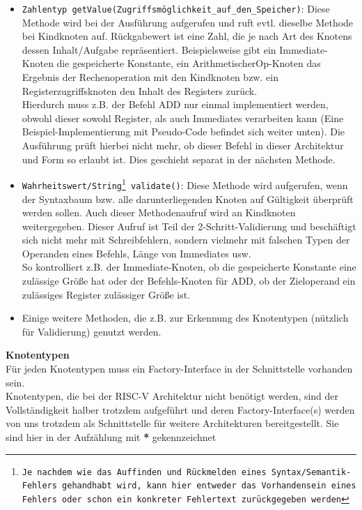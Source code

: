 \begin{itemize}
	\item \texttt{Zahlentyp getValue(Zugriffsmöglichkeit\_auf\_den\_Speicher)}: Diese Methode wird bei der Ausführung aufgerufen und ruft evtl. dieselbe Methode bei Kindknoten auf. Rückgabewert ist eine Zahl, die je nach Art des Knotens dessen Inhalt/Aufgabe repräsentiert. Beispielsweise gibt ein Immediate-Knoten die gespeicherte Konstante, ein ArithmetischerOp-Knoten das Ergebnis der Rechenoperation mit den Kindknoten bzw. ein Registerzugriffsknoten den Inhalt des Registers zurück.\\
	Hierdurch muss z.B. der Befehl ADD nur einmal implementiert werden, obwohl dieser sowohl Register, als auch Immediates verarbeiten kann (Eine Beispiel-Implementierung mit Pseudo-Code befindet sich weiter unten). Die Ausführung prüft hierbei nicht mehr, ob dieser Befehl in dieser Architektur und Form so erlaubt ist. Dies geschieht separat in der nächsten Methode.

	\item \texttt{Wahrheitswert/String\footnote{Je nachdem wie das Auffinden und Rückmelden eines Syntax/Semantik-Fehlers gehandhabt wird, kann hier entweder das Vorhandensein eines Fehlers oder schon ein konkreter Fehlertext zurückgegeben werden} validate()}: Diese Methode wird aufgerufen, wenn der Syntaxbaum bzw. alle darunterliegenden Knoten auf Gültigkeit überprüft werden sollen. Auch dieser Methodenaufruf wird an Kindknoten weitergegeben. Dieser Aufruf ist Teil der 2-Schritt-Validierung und beschäftigt sich nicht mehr mit Schreibfehlern, sondern vielmehr mit falschen Typen der Operanden eines Befehls, Länge von Immediates usw.\\
	So kontrolliert z.B. der Immediate-Knoten, ob die gespeicherte Konstante eine zulässige Größe hat oder der Befehls-Knoten für ADD, ob der Zieloperand ein zulässiges Register zulässiger Größe ist.

	\item Einige weitere Methoden, die z.B. zur Erkennung des Knotentypen (nützlich für Validierung)  genutzt werden.
\end{itemize}
\textbf{Knotentypen}\\
Für jeden Knotentypen muss ein Factory-Interface in der Schnittstelle vorhanden sein.\\
Knotentypen, die bei der RISC-V Architektur nicht benötigt werden, sind der Vollständigkeit halber trotzdem aufgeführt und deren Factory-Interface(s) werden von uns trotzdem als Schnittstelle für weitere Architekturen bereitgestellt. Sie sind hier in der Aufzählung mit \textbf{*} gekennzeichnet
